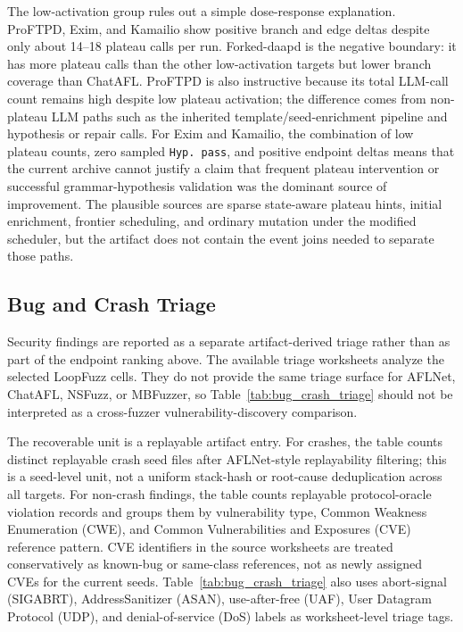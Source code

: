 \documentclass[final,5p,times,number]{elsarticle}
\begin{document}
The low-activation group rules out a simple dose-response explanation. ProFTPD, Exim, and Kamailio show positive branch and edge deltas despite only about 14--18 plateau calls per run. Forked-daapd is the negative boundary: it has more plateau calls than the other low-activation targets but lower branch coverage than ChatAFL. ProFTPD is also instructive because its total LLM-call count remains high despite low plateau activation; the difference comes from non-plateau LLM paths such as the inherited template/seed-enrichment pipeline and hypothesis or repair calls. For Exim and Kamailio, the combination of low plateau counts, zero sampled \texttt{Hyp. pass}, and positive endpoint deltas means that the current archive cannot justify a claim that frequent plateau intervention or successful grammar-hypothesis validation was the dominant source of improvement. The plausible sources are sparse state-aware plateau hints, initial enrichment, frontier scheduling, and ordinary mutation under the modified scheduler, but the artifact does not contain the event joins needed to separate those paths.

\subsection{Bug and Crash Triage}
\label{sec:bug_crash_triage}

Security findings are reported as a separate artifact-derived triage rather than as part of the endpoint ranking above. The available triage worksheets analyze the selected LoopFuzz cells. They do not provide the same triage surface for AFLNet, ChatAFL, NSFuzz, or MBFuzzer, so Table~\ref{tab:bug_crash_triage} should not be interpreted as a cross-fuzzer vulnerability-discovery comparison.

The recoverable unit is a replayable artifact entry. For crashes, the table counts distinct replayable crash seed files after AFLNet-style replayability filtering; this is a seed-level unit, not a uniform stack-hash or root-cause deduplication across all targets. For non-crash findings, the table counts replayable protocol-oracle violation records and groups them by vulnerability type, Common Weakness Enumeration (CWE), and Common Vulnerabilities and Exposures (CVE) reference pattern. CVE identifiers in the source worksheets are treated conservatively as known-bug or same-class references, not as newly assigned CVEs for the current seeds. Table~\ref{tab:bug_crash_triage} also uses abort-signal (SIGABRT), AddressSanitizer (ASAN), use-after-free (UAF), User Datagram Protocol (UDP), and denial-of-service (DoS) labels as worksheet-level triage tags.
\end{document}
